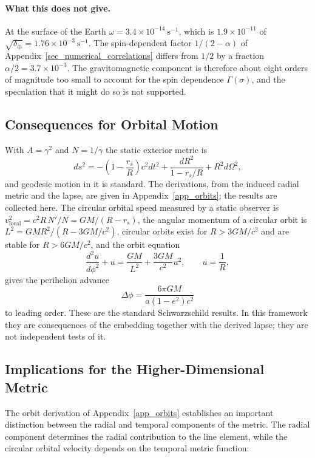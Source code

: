 \documentclass[pdflatex,sn-mathphys-num]{sn-jnl}%
\theoremstyle{thmstyleone}%
\theoremstyle{thmstyletwo}%
\theoremstyle{thmstylethree}%
\begin{document}
\paragraph{What this does not give.} At the surface of the Earth $\omega=3.4\times10^{-14}~\mathrm{s^{-1}}$, which is $1.9\times10^{-11}$ of $\sqrt{\delta_\oplus}=1.76\times10^{-3}~\mathrm{s^{-1}}$. The spin-dependent factor $1/(2-\alpha)$ of Appendix~\ref{sec_numerical_correlations} differs from $1/2$ by a fraction $\alpha/2=3.7\times10^{-3}$. The gravitomagnetic component is therefore about eight orders of magnitude too small to account for the spin dependence $\Gamma(\sigma)$, and the speculation that it might do so is not supported.


\subsection{Consequences for Orbital Motion}\label{sec_orbit_consequences}

With $A=\gamma^2$ and $N=1/\gamma$ the static exterior metric is
\begin{equation}
    ds^2=-\left(1-\frac{r_s}{R}\right)c^2dt^2+\frac{dR^2}{1-r_s/R}+R^2d\Omega^2 ,
\end{equation}
and geodesic motion in it is standard. The derivations, from the induced radial metric and the lapse, are given in Appendix~\ref{app_orbits}; the results are collected here. The circular orbital speed measured by a static observer is $v_{\mathrm{local}}^2=c^2R\,N'/N=GM/(R-r_s)$, the angular momentum of a circular orbit is $L^2=GMR^2/(R-3GM/c^2)$, circular orbits exist for $R>3GM/c^2$ and are stable for $R>6GM/c^2$, and the orbit equation
\begin{equation}
    \frac{d^2u}{d\phi^2}+u=\frac{GM}{L^2}+\frac{3GM}{c^2}u^2,\qquad u=\frac1R,
\end{equation}
gives the perihelion advance
\begin{equation}
    \Delta\phi=\frac{6\pi GM}{a(1-e^2)c^2}
\end{equation}
to leading order. These are the standard Schwarzschild results. In this framework they are consequences of the embedding together with the derived lapse; they are not independent tests of it.


\subsection{Implications for the Higher-Dimensional Metric}

The orbit derivation of Appendix~\ref{app_orbits} establishes an important distinction between the radial and temporal components of the metric. The radial component determines the radial contribution to the line element, while the circular orbital velocity depends on the temporal metric function:
\end{document}
